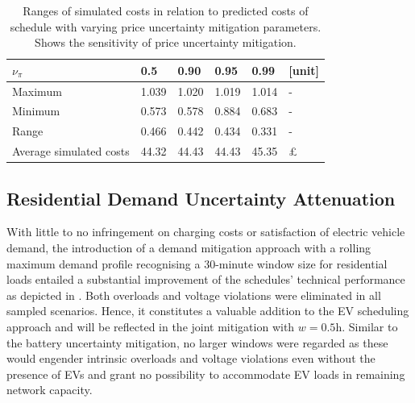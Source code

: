 \begin{table}[]
	\centering
		\begin{tabular}{@{}llllll@{}}
			\toprule
			$\nu_\pi$ & \textbf{0.5}   & \textbf{0.90}   & \textbf{0.95}   & \textbf{0.99}  & \textbf{[unit]} \\ \midrule
			Maximum & 1.039 & 1.020 & 1.019 & 1.014 & - \\
			Minimum & 0.573 & 0.578 & 0.884 & 0.683 & -\\
			Range     & 0.466 & 0.442 & 0.434 & 0.331 &-  \\
			Average simulated costs & 44.32 & 44.43 & 44.43 & 45.35 & \pounds\\ \bottomrule
		\end{tabular}%
	\caption[Sensitivity of price uncertainty mitigation parameters]{Ranges of simulated costs in relation to predicted costs of schedule with varying price uncertainty mitigation parameters. Shows the sensitivity of price uncertainty mitigation.}
	\label{tab:costrange}
\end{table}

\subsection{Residential Demand Uncertainty Attenuation}

With little to no infringement on charging costs or satisfaction of electric vehicle demand, the introduction of a demand mitigation approach with a rolling maximum demand profile recognising a 30-minute window size for residential loads entailed a substantial improvement of the schedules' technical performance as depicted in . Both overloads and voltage violations were eliminated in all sampled scenarios. Hence, it constitutes a valuable addition to the EV scheduling approach and will be reflected in the joint mitigation with $w = 0.5$h. Similar to the battery uncertainty mitigation, no larger windows were regarded as these would engender intrinsic overloads and voltage violations even without the presence of EVs and grant no possibility to accommodate EV loads in remaining network capacity.

